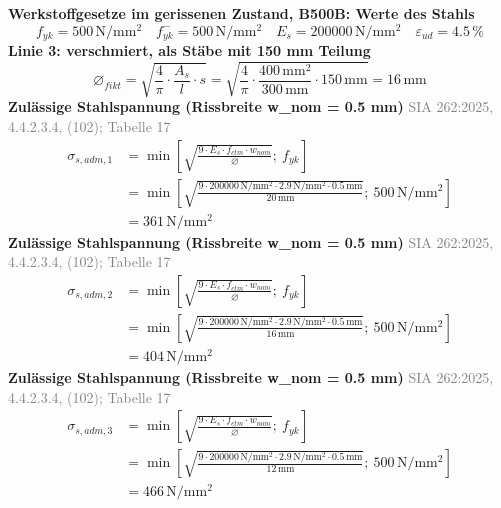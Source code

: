 \documentclass[11pt,a4paper]{article}
\newcommand{\normref}[1]{{\small\textcolor{gray}{#1}}}
\begin{document}
\noindent\textbf{Werkstoffgesetze im gerissenen Zustand, B500B: Werte des Stahls}
\begin{equation*}
f_{yk} = 500\,\mathrm{N}/\mathrm{mm}^{2} \quad f_{yk}^{-} = 500\,\mathrm{N}/\mathrm{mm}^{2} \quad E_s = 200000\,\mathrm{N}/\mathrm{mm}^{2} \quad \varepsilon_{ud} = 4.5\,\%
\end{equation*}
\noindent\textbf{Linie 3: verschmiert, als Stäbe mit 150 mm Teilung}
\begin{equation*}
\varnothing_{fikt} = \sqrt{\frac{4}{\pi} \cdot \frac{A_s}{l} \cdot s} = \sqrt{\frac{4}{\pi} \cdot \frac{400\,\mathrm{mm}^{2}}{300\,\mathrm{mm}} \cdot 150\,\mathrm{mm}} = 16\,\mathrm{mm}
\end{equation*}
\noindent\textbf{Zulässige Stahlspannung (Rissbreite w\_nom = 0.5 mm)} \hfill \normref{SIA 262:2025, 4.4.2.3.4, (102); Tabelle 17}
\begin{equation*}
\begin{aligned}
  \sigma_{s,adm,1} &= \min\left[\sqrt{\frac{9 \cdot E_s \cdot f_{ctm} \cdot w_{nom}}{\varnothing}};\ f_{yk}\right] \\
  &= \min\left[\sqrt{\frac{9 \cdot 200000\,\mathrm{N}/\mathrm{mm}^{2} \cdot 2.9\,\mathrm{N}/\mathrm{mm}^{2} \cdot 0.5\,\mathrm{mm}}{20\,\mathrm{mm}}};\ 500\,\mathrm{N}/\mathrm{mm}^{2}\right] \\
  &= 361\,\mathrm{N}/\mathrm{mm}^{2}
\end{aligned}
\end{equation*}
\noindent\textbf{Zulässige Stahlspannung (Rissbreite w\_nom = 0.5 mm)} \hfill \normref{SIA 262:2025, 4.4.2.3.4, (102); Tabelle 17}
\begin{equation*}
\begin{aligned}
  \sigma_{s,adm,2} &= \min\left[\sqrt{\frac{9 \cdot E_s \cdot f_{ctm} \cdot w_{nom}}{\varnothing}};\ f_{yk}\right] \\
  &= \min\left[\sqrt{\frac{9 \cdot 200000\,\mathrm{N}/\mathrm{mm}^{2} \cdot 2.9\,\mathrm{N}/\mathrm{mm}^{2} \cdot 0.5\,\mathrm{mm}}{16\,\mathrm{mm}}};\ 500\,\mathrm{N}/\mathrm{mm}^{2}\right] \\
  &= 404\,\mathrm{N}/\mathrm{mm}^{2}
\end{aligned}
\end{equation*}
\noindent\textbf{Zulässige Stahlspannung (Rissbreite w\_nom = 0.5 mm)} \hfill \normref{SIA 262:2025, 4.4.2.3.4, (102); Tabelle 17}
\begin{equation*}
\begin{aligned}
  \sigma_{s,adm,3} &= \min\left[\sqrt{\frac{9 \cdot E_s \cdot f_{ctm} \cdot w_{nom}}{\varnothing}};\ f_{yk}\right] \\
  &= \min\left[\sqrt{\frac{9 \cdot 200000\,\mathrm{N}/\mathrm{mm}^{2} \cdot 2.9\,\mathrm{N}/\mathrm{mm}^{2} \cdot 0.5\,\mathrm{mm}}{12\,\mathrm{mm}}};\ 500\,\mathrm{N}/\mathrm{mm}^{2}\right] \\
  &= 466\,\mathrm{N}/\mathrm{mm}^{2}
\end{aligned}
\end{equation*}
\end{document}
